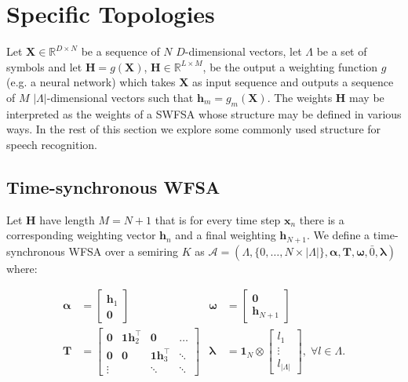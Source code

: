 \section{Specific Topologies }

Let $\mathbf{X} \in \mathbb{R}^{D \times N}$ be a sequence of $N$ $D$-dimensional vectors, let $\Lambda$ be a set of symbols and let $\mathbf{H} = g(\mathbf{X})$,  $\mathbf{H} \in \mathbb{R}^{L \times M}$, be the output a weighting function $g$ (e.g. a neural network) which takes $\mathbf{X}$ as input sequence and outputs a sequence of $M$ $|\Lambda|$-dimensional vectors such that $\mathbf{h}_{m} = g_m ( \mathbf{X})$. The weights $\mathbf{H}$ may be interpreted as the weights of a SWFSA whose structure may be defined in various ways. In the rest of this section we explore some commonly used structure for speech recognition. 

\subsection{Time-synchronous WFSA}

Let $\mathbf{H}$ have length  $M = N + 1$ that is for every time step $\mathbf{x}_n$ there is a corresponding weighting vector $\mathbf{h}_n$ and a final weighting $\mathbf{h}_{N+1}$. We define a time-synchronous WFSA over a semiring $K$ as $\mathcal{A} = (\Lambda, \{0, \dots, N \times |\Lambda| \}, \boldsymbol{\alpha}, \mathbf{T}, \boldsymbol{\omega}, \bar{0}, \boldsymbol{\lambda})$ where:

\begin{align}
    \boldsymbol{\alpha} &= \begin{bmatrix} \mathbf{h}_1 \\ \mathbf{0} \end{bmatrix} & \boldsymbol{\omega} &= \begin{bmatrix} \mathbf{0} \\ \mathbf{h}_{N+1} \end{bmatrix} \\
    \mathbf{T} &= \begin{bmatrix}
        \mathbf{0} & \mathbf{1} \mathbf{h}_2^\top & \mathbf{0} & \dots\\
        \mathbf{0} & \mathbf{0} & \mathbf{1} \mathbf{h}_3^\top & \ddots \\
        \vdots & & \ddots & \ddots 
    \end{bmatrix} & \boldsymbol{\lambda} &= \mathbf{1}_{N} \otimes \begin{bmatrix} 
        l_1 \\ \vdots \\ l_{|\Lambda|}
    \end{bmatrix}, \; \forall l \in \Lambda.
\end{align}


